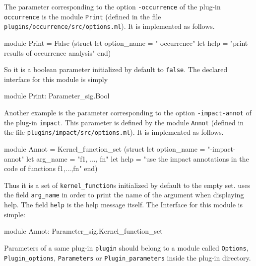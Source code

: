 \begin{example}
  The parameter corresponding to the option \texttt{-occurrence} of the plug-in
  \texttt{occurrence} is the module \texttt{Print} (defined in the file
  \texttt{plugins/occurrence/src/options.ml}). It is implemented as follows.
\begin{ocamlcode}
module Print =
  False
    (struct
       let option_name = "-occurrence"
       let help = "print results of occurrence analysis"
     end)
\end{ocamlcode}
So it is a boolean parameter initialized by default to
\texttt{false}. The declared interface for this module is simply
\begin{ocamlcode}
module Print: Parameter_sig.Bool
\end{ocamlcode}

Another example is the parameter corresponding to the option
\texttt{-impact-annot} of the plug-in \texttt{impact}. This parameter is
defined by the module \texttt{Annot} (defined in the file
\texttt{plugins/impact/src/options.ml}). It is implemented as follows.
\begin{ocamlcode}
module Annot =
  Kernel_function_set
    (struct
       let option_name = "-impact-annot"
       let arg_name = "f1, ..., fn"
       let help = "use the impact annotations in the code of functions f1,...,fn"
     end)
\end{ocamlcode}
Thus it is a set of \texttt{kernel\_function}s initialized by default to
the empty set. \framac uses
the field \texttt{arg\_name} in order to print the name of the argument when
displaying help. The field \texttt{help} is the help message itself. The
Interface for this module is simple:
\begin{ocamlcode}
module Annot: Parameter_sig.Kernel_function_set
\end{ocamlcode}
\end{example}

\begin{convention}
Parameters of a same plug-in \texttt{plugin} should belong to a module called
\texttt{Options}, \texttt{Plugin\_options}, \texttt{Parameters} or
\texttt{Plugin\_parameters} inside the plug-in directory.
\end{convention}

